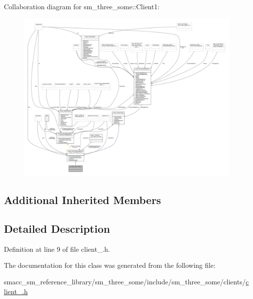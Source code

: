 Collaboration diagram for sm\+\_\+three\+\_\+some\+:\+:Client1\+:
\nopagebreak
\begin{figure}[H]
\begin{center}
\leavevmode
\includegraphics[width=350pt]{classsm__three__some_1_1Client1__coll__graph}
\end{center}
\end{figure}
\subsection*{Additional Inherited Members}


\subsection{Detailed Description}


Definition at line 9 of file client\+\_.\+h.



The documentation for this class was generated from the following file\+:\begin{DoxyCompactItemize}
\item 
smacc\+\_\+sm\+\_\+reference\+\_\+library/sm\+\_\+three\+\_\+some/include/sm\+\_\+three\+\_\+some/clients/\hyperlink{client__1_8h}{client\+\_.\+h}\end{DoxyCompactItemize}
